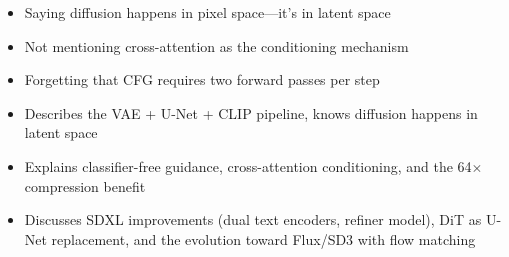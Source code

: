 \begin{interviewq}
\redflags
\begin{itemize}
    \item Saying diffusion happens in pixel space---it's in latent space
    \item Not mentioning cross-attention as the conditioning mechanism
    \item Forgetting that CFG requires two forward passes per step
\end{itemize}


\goodgreat
\begin{itemize}
    \item {} Describes the VAE + U-Net + CLIP pipeline, knows diffusion happens in latent space
    \item {} Explains classifier-free guidance, cross-attention conditioning, and the 64$\times$ compression benefit
    \item {} Discusses SDXL improvements (dual text encoders, refiner model), DiT as U-Net replacement, and the evolution toward Flux/SD3 with flow matching
\end{itemize}

\end{interviewq}

